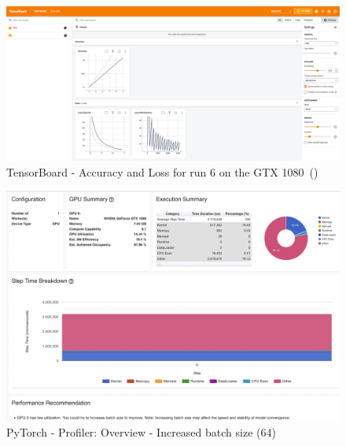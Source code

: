 \documentclass[12pt, a4paper, hidelinks]{article}
\begin{document}
\begin{figure}[H]
\centering
\includegraphics[width=1\textwidth]{./assets/scap_gtx1080_tensorboard_14615343}
\caption[TensorBoard - Accuracy and Loss]{TensorBoard - Accuracy and Loss for run 6 on the GTX 1080~()}
\label{fig:scap_gtx1080_tensorboard_14615343}
\end{figure}

\begin{figure}[H]
\centering
\includegraphics[width=1\textwidth]{./assets/scap_gtx1080_profiler-torch_batch-size-64_14650758}
\caption[PyTorch - Profiler: Overview - Increased batch size (64)]{PyTorch - Profiler: Overview - Increased batch size (64)}
\label{fig:scap_gtx1080_profiler-torch_batch-size-64_14650758}
\end{figure}
\end{document}
